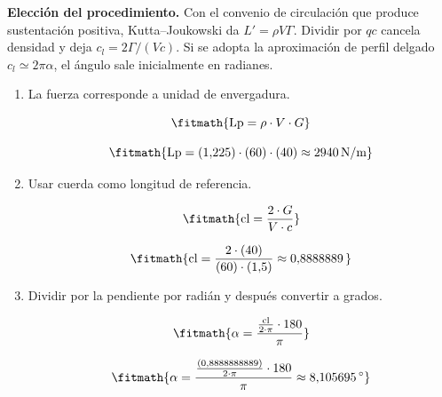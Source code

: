 \noindent\textbf{Elección del procedimiento.} Con el convenio de circulación que produce sustentación positiva, Kutta--Joukowski da $L\prime=\rho V\Gamma$. Dividir por $q c$ cancela densidad y deja $c_l=2\Gamma/(Vc)$. Si se adopta la aproximación de perfil delgado $c_l\simeq2\pi\alpha$, el ángulo sale inicialmente en radianes.

\begin{enumerate}

\item La fuerza corresponde a unidad de envergadura.

\[\fitmath{\mathrm{Lp}=\rho\cdot V\cdot G}\]

\[\fitmath{\mathrm{Lp}=(1{,}225)\cdot (60)\cdot (40)\approx 2940\,\mathrm{N/m}}\]

\item Usar cuerda como longitud de referencia.

\[\fitmath{\mathrm{cl}=\frac{2\cdot G}{V\cdot c}}\]

\[\fitmath{\mathrm{cl}=\frac{2\cdot (40)}{(60)\cdot (1{,}5)}\approx 0{,}8888889\,}\]

\item Dividir por la pendiente por radián y después convertir a grados.

\[\fitmath{\alpha=\frac{\frac{\mathrm{cl}}{2\cdot \pi}\cdot 180}{\pi}}\]

\[\fitmath{\alpha=\frac{\frac{(0{,}8888888889)}{2\cdot \pi}\cdot 180}{\pi}\approx 8{,}105695\,{}^{\circ}}\]

\end{enumerate}
